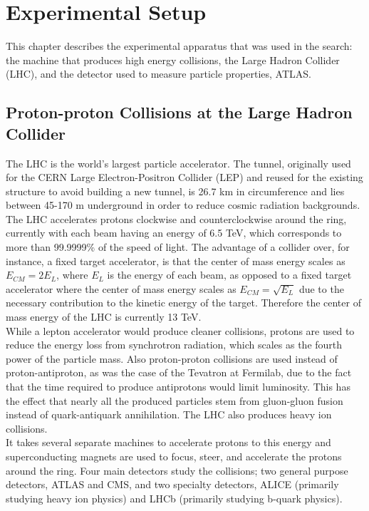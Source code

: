 \chapter{Experimental Setup}
\label{ch:experiment}

This chapter describes the experimental apparatus that was used in the search: the machine that produces high energy collisions, the Large Hadron Collider (LHC), and the detector used to measure particle properties, ATLAS.

\section{Proton-proton Collisions at the Large Hadron Collider}
The LHC is the world's largest particle accelerator.  The tunnel, originally used for the CERN Large Electron-Positron Collider (LEP) and reused for the existing structure to avoid building a new tunnel, is 26.7 km in circumference and lies between 45-170 m underground in order to reduce cosmic radiation backgrounds.  The LHC accelerates protons clockwise and counterclockwise around the ring, currently with each beam having an energy of 6.5 TeV, which corresponds to more than 99.9999\% of the speed of light.  The advantage of a collider over, for instance, a fixed target accelerator, is that the center of mass energy scales as $E_{CM} = 2E_{L}$, where $E_{L}$ is the energy of each beam, as opposed to a fixed target accelerator where the center of mass energy scales as $E_{CM}=\sqrt{E_{L}}$ due to the necessary contribution to the kinetic energy of the target.  Therefore the center of mass energy of the LHC is currently 13 TeV.\\

While a lepton accelerator would produce cleaner collisions, protons are used to reduce the energy loss from synchrotron radiation, which scales as the fourth power of the particle mass.  Also proton-proton collisions are used instead of proton-antiproton, as was the case of the Tevatron at Fermilab, due to the fact that the time required to produce antiprotons would limit luminosity.  This has the effect that nearly all the produced particles stem from gluon-gluon fusion instead of quark-antiquark annihilation.  The LHC also produces heavy ion collisions.\\

It takes several separate machines to accelerate protons to this energy and superconducting magnets are used to focus, steer, and accelerate the protons around the ring.  Four main detectors study the collisions; two general purpose detectors, ATLAS and CMS, and two specialty detectors, ALICE (primarily studying heavy ion physics) and LHCb (primarily studying b-quark physics). \\%



